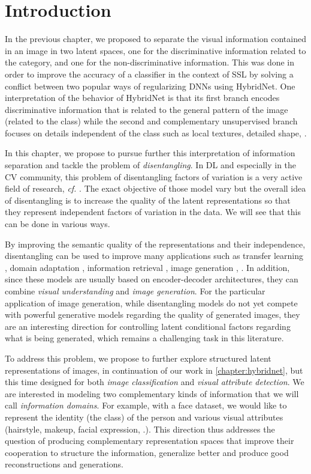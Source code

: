 \section{Introduction}

In the previous chapter, we proposed to separate the visual information contained in an image in two latent spaces, one for the discriminative information related to the category, and one for the non-discriminative information. This was done in order to improve the accuracy of a classifier in the context of \ac{SSL} by solving a conflict between two popular ways of regularizing \acp{DNN} using HybridNet. One interpretation of the behavior of HybridNet is that its first branch encodes discriminative information that is related to the general pattern of the image (related to the class) while the second and complementary unsupervised branch focuses on details independent of the class such as local textures, detailed shape, \etc.

In this chapter, we propose to pursue further this interpretation of information separation and tackle the problem of \textit{disentangling}.
In \ac{DL} and especially in the \ac{CV} community, this problem of disentangling factors of variation is a very active field of research, \textit{cf.} \citet{higgins2018towards}. The exact objective of those model vary but the overall idea of disentangling is to increase the quality of the latent representations so that they represent independent factors of variation in the data. We will see that this can be done in various ways.

By improving the semantic quality of the representations and their independence, disentangling can be used to improve many applications such as transfer learning \citep{ruiz2019learning}, domain adaptation \citep{chang2019all,louizos2016}, information retrieval \citep{Mathieu2016}, image generation \citep{perarnau2016invertible}, \etc. In addition, since these models are usually based on encoder-decoder architectures, they can combine \textit{visual understanding} and \textit{image generation}. For the particular application of image generation, while disentangling models do not yet compete with powerful generative models \citep[\eg\unskip][]{karras2018style} regarding the quality of generated images, they are an interesting direction for controlling latent conditional factors regarding what is being generated, which remains a challenging task in this literature.


To address this problem, we propose to further explore structured latent representations of images, in continuation of our work in \autoref{chapter:hybridnet}, but this time designed for both \textit{image classification} and \textit{visual attribute detection}. We are interested in modeling two complementary kinds of information that we will call \textit{information domains}. For example, with a face dataset, we would like to represent the identity (\ie the class) of the person and various visual attributes (hairstyle, makeup, facial expression, \etc.). This direction thus addresses the question of producing complementary representation spaces that improve their cooperation to structure the information, generalize better and produce good reconstructions and generations.

